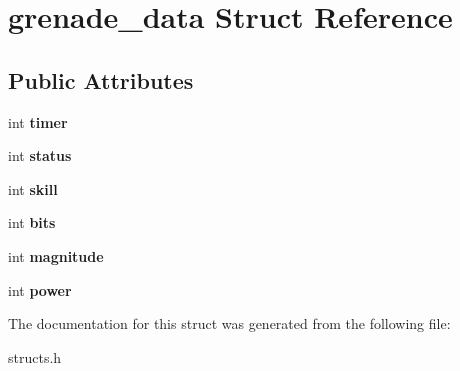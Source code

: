 \hypertarget{structgrenade__data}{\section{grenade\-\_\-data Struct Reference}
\label{structgrenade__data}
}
\subsection*{Public Attributes}
\begin{DoxyCompactItemize}
\item 
\hypertarget{structgrenade__data_a57800189fccf7530e4497102c8fdd203}{int {\bfseries timer}}\label{structgrenade__data_a57800189fccf7530e4497102c8fdd203}

\item 
\hypertarget{structgrenade__data_ad08b07a9b38e50e92559ae368a8f845c}{int {\bfseries status}}\label{structgrenade__data_ad08b07a9b38e50e92559ae368a8f845c}

\item 
\hypertarget{structgrenade__data_a9bff04e0e06b0154450e9ff48d0bf3a6}{int {\bfseries skill}}\label{structgrenade__data_a9bff04e0e06b0154450e9ff48d0bf3a6}

\item 
\hypertarget{structgrenade__data_a46484cc301a9a80eddbc7dde6566fb3e}{int {\bfseries bits}}\label{structgrenade__data_a46484cc301a9a80eddbc7dde6566fb3e}

\item 
\hypertarget{structgrenade__data_a59c291091ff3df3d9e8aa03fa79c526e}{int {\bfseries magnitude}}\label{structgrenade__data_a59c291091ff3df3d9e8aa03fa79c526e}

\item 
\hypertarget{structgrenade__data_acfbd2c54ce5924b79f629f87c2b7f520}{int {\bfseries power}}\label{structgrenade__data_acfbd2c54ce5924b79f629f87c2b7f520}

\end{DoxyCompactItemize}


The documentation for this struct was generated from the following file\-:\begin{DoxyCompactItemize}
\item 
structs.\-h\end{DoxyCompactItemize}
